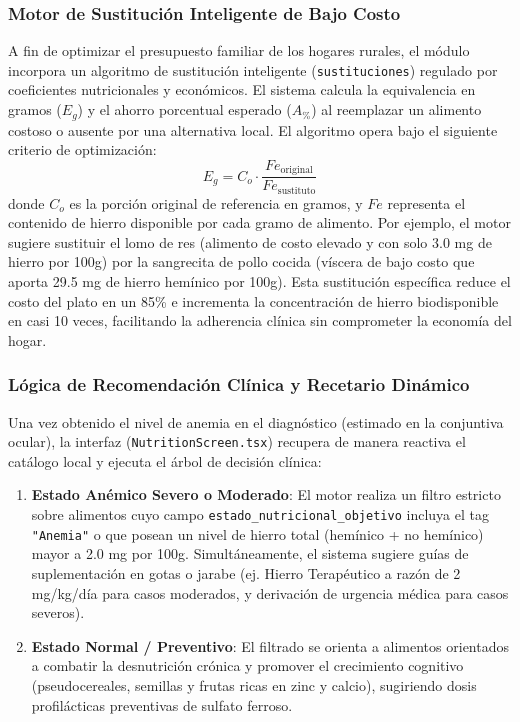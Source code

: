 \subsubsection{Motor de Sustitución Inteligente de Bajo Costo}
A fin de optimizar el presupuesto familiar de los hogares rurales, el módulo incorpora un algoritmo de sustitución inteligente (\texttt{sustituciones}) regulado por coeficientes nutricionales y económicos. El sistema calcula la equivalencia en gramos ($E_g$) y el ahorro porcentual esperado ($A_{\%}$) al reemplazar un alimento costoso o ausente por una alternativa local. El algoritmo opera bajo el siguiente criterio de optimización:
\begin{equation}
    E_g = C_o \cdot \frac{Fe_{\text{original}}}{Fe_{\text{sustituto}}}
\end{equation}
donde $C_o$ es la porción original de referencia en gramos, y $Fe$ representa el contenido de hierro disponible por cada gramo de alimento. Por ejemplo, el motor sugiere sustituir el lomo de res (alimento de costo elevado y con solo 3.0 mg de hierro por 100g) por la sangrecita de pollo cocida (víscera de bajo costo que aporta 29.5 mg de hierro hemínico por 100g). Esta sustitución específica reduce el costo del plato en un 85\% e incrementa la concentración de hierro biodisponible en casi 10 veces, facilitando la adherencia clínica sin comprometer la economía del hogar.

\subsubsection{Lógica de Recomendación Clínica y Recetario Dinámico}
Una vez obtenido el nivel de anemia en el diagnóstico (estimado en la conjuntiva ocular), la interfaz (\texttt{NutritionScreen.tsx}) recupera de manera reactiva el catálogo local y ejecuta el árbol de decisión clínica:
\begin{enumerate}
    \item \textbf{Estado Anémico Severo o Moderado}: El motor realiza un filtro estricto sobre alimentos cuyo campo \texttt{estado\_nutricional\_objetivo} incluya el tag \texttt{"Anemia"} o que posean un nivel de hierro total (hemínico + no hemínico) mayor a 2.0 mg por 100g. Simultáneamente, el sistema sugiere guías de suplementación en gotas o jarabe (ej. Hierro Terapéutico a razón de 2 mg/kg/día para casos moderados, y derivación de urgencia médica para casos severos).
    \item \textbf{Estado Normal / Preventivo}: El filtrado se orienta a alimentos orientados a combatir la desnutrición crónica y promover el crecimiento cognitivo (pseudocereales, semillas y frutas ricas en zinc y calcio), sugiriendo dosis profilácticas preventivas de sulfato ferroso.
\end{enumerate}

